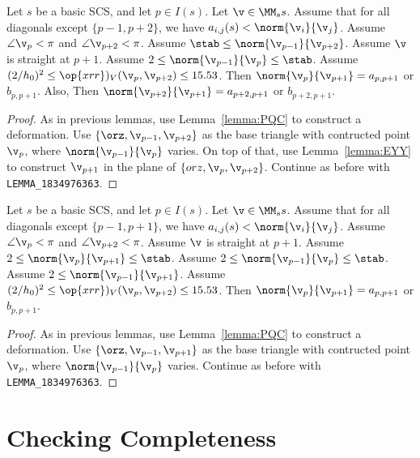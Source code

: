 \begin{lemma}[1834 str]\label{lemma:1834 str}
Let $s$ be a basic SCS, and let $p\in I(s)$.  Let $\v\in \MM_ss$.
Assume that for all diagonals except $\{p-1,p+2\}$,
we have $a_{i,j}(s)<\norm{\v_i}{\v_j}$.  Assume $\angle \v_p < \pi$ and $\angle \v_{p+2} < \pi$.
Assume $\stab \le \norm{\v_{p-1}}{\v_{p+2}}$.
Assume $\v$ is straight at $p+1$.
Assume $2\le  \norm{\v_{p-1}}{\v_{p}}\le \stab$.
Assume $(2/h_0)^2 \le \op{xrr})_V (\v_p,\v_{p+2}) \le 15.53$.
Then $\norm{\v_p}{\v_{p+1}} = a_{p,p+1}$ or $b_{p,p+1}$.  Also,
Then $\norm{\v_{p+2}}{\v_{p+1}} = a_{p+2,p+1}$ or $b_{p+2,p+1}$. 
\end{lemma}

\begin{proof} As in previous lemmas, use Lemma~\ref{lemma:PQC} to construct a deformation.
Use $\{\orz,\v_{p-1},\v_{p+2}\}$ as the base triangle with contructed point $\v_p$, where $\norm{\v_{p-1}}{\v_p}$ varies.
On top of that, use Lemma~\ref{lemma:EYY} to construct $\v_{p+1}$ in the plane of $\{orz,\v_p,\v_{p+2}\}$.
Continue as before with {\tt LEMMA\_1834976363}.
\end{proof}

\begin{lemma}[1834]\label{lemma:1834}
Let $s$ be a basic SCS, and let $p\in I(s)$.  Let $\v\in \MM_ss$.
Assume that for all diagonals except $\{p-1,p+1\}$,
we have $a_{i,j}(s)<\norm{\v_i}{\v_j}$.  Assume $\angle \v_p < \pi$ and $\angle \v_{p+2} < \pi$.
Assume $\v$ is straight at $p+1$.
Assume $2\le  \norm{\v_{p}}{\v_{p+1}}\le \stab$.
Assume $2\le \norm{\v_{p-1}}{\v_p}\le \stab$.
Assume $2 \le \norm{\v_{p-1}}{\v_{p+1}}$.
Assume $(2/h_0)^2 \le \op{xrr})_V (\v_p,\v_{p+2}) \le 15.53$.
Then $\norm{\v_p}{\v_{p+1}} = a_{p,p+1}$ or $b_{p,p+1}$.  
\end{lemma}

\begin{proof} As in previous lemmas, use Lemma~\ref{lemma:PQC} to construct a deformation.
Use $\{\orz,\v_{p-1},\v_{p+1}\}$ as the base triangle with contructed point $\v_p$, where $\norm{\v_{p-1}}{\v_p}$ varies.
Continue as before with {\tt LEMMA\_1834976363}.
\end{proof}


\newpage
\section{Checking Completeness}

\def\prop{$\text{pro}^+$\relax}
\def\proeight{$\text{pro}_8$\relax}

